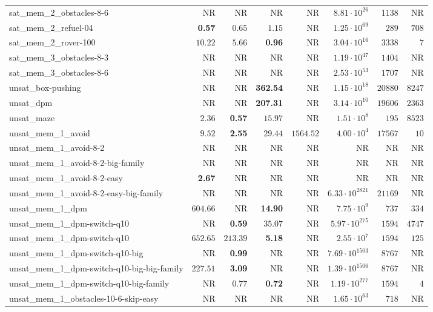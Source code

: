 \begin{tabular}{lrrrrrrr}
sat\_mem\_2\_obstacles-8-6 & NR & NR & NR & NR & $8.81\cdot 10^{26}$ & $1138$ & NR \\
sat\_mem\_2\_refuel-04 & \textbf{0.57} & $0.65$ & $1.15$ & NR & $1.25\cdot 10^{69}$ & $289$ & $708$ \\
sat\_mem\_2\_rover-100 & $10.22$ & $5.66$ & \textbf{0.96} & NR & $3.04\cdot 10^{16}$ & $3338$ & $7$ \\
sat\_mem\_3\_obstacles-8-3 & NR & NR & NR & NR & $1.19\cdot 10^{47}$ & $1404$ & NR \\
sat\_mem\_3\_obstacles-8-6 & NR & NR & NR & NR & $2.53\cdot 10^{53}$ & $1707$ & NR \\
unsat\_box-pushing & NR & NR & \textbf{362.54} & NR & $1.15\cdot 10^{18}$ & $20880$ & $8247$ \\
unsat\_dpm & NR & NR & \textbf{207.31} & NR & $3.14\cdot 10^{10}$ & $19606$ & $2363$ \\
unsat\_maze & $2.36$ & \textbf{0.57} & $15.97$ & NR & $1.51\cdot 10^{8}$ & $195$ & $8523$ \\
unsat\_mem\_1\_avoid & $9.52$ & \textbf{2.55} & $29.44$ & $1564.52$ & $4.00\cdot 10^{4}$ & $17567$ & $10$ \\
unsat\_mem\_1\_avoid-8-2 & NR & NR & NR & NR & NR & NR & NR \\
unsat\_mem\_1\_avoid-8-2-big-family & NR & NR & NR & NR & NR & NR & NR \\
unsat\_mem\_1\_avoid-8-2-easy & \textbf{2.67} & NR & NR & NR & NR & NR & NR \\
unsat\_mem\_1\_avoid-8-2-easy-big-family & NR & NR & NR & NR & $6.33\cdot 10^{2821}$ & $21169$ & NR \\
unsat\_mem\_1\_dpm & $604.66$ & NR & \textbf{14.90} & NR & $7.75\cdot 10^{9}$ & $737$ & $334$ \\
unsat\_mem\_1\_dpm-switch-q10 & NR & \textbf{0.59} & $35.07$ & NR & $5.97\cdot 10^{275}$ & $1594$ & $4747$ \\
unsat\_mem\_1\_dpm-switch-q10 & $652.65$ & $213.39$ & \textbf{5.18} & NR & $2.55\cdot 10^{7}$ & $1594$ & $125$ \\
unsat\_mem\_1\_dpm-switch-q10-big & NR & \textbf{0.99} & NR & NR & $7.69\cdot 10^{1503}$ & $8767$ & NR \\
unsat\_mem\_1\_dpm-switch-q10-big-big-family & $227.51$ & \textbf{3.09} & NR & NR & $1.39\cdot 10^{1506}$ & $8767$ & NR \\
unsat\_mem\_1\_dpm-switch-q10-big-family & NR & $0.77$ & \textbf{0.72} & NR & $1.19\cdot 10^{277}$ & $1594$ & $4$ \\
unsat\_mem\_1\_obstacles-10-6-skip-easy & NR & NR & NR & NR & $1.65\cdot 10^{63}$ & $718$ & NR \\

\end{tabular}
